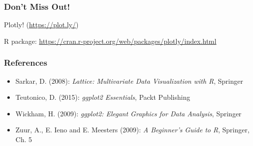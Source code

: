 \documentclass[10pt]{beamer}
\theoremstyle{definition}
\begin{document}
\begin{frame}[fragile]
\frametitle{Don't Miss Out!}
\begin{center}
\Huge{Plotly!}
(\url{https://plot.ly/})
\end{center}
R package: \url{https://cran.r-project.org/web/packages/plotly/index.html}
\end{frame}

\begin{frame}[fragile]
\frametitle{References}
\begin{itemize}
	\item Sarkar, D. (2008): \emph{Lattice: Multivariate Data Visualization with R}, Springer
	\item Teutonico, D. (2015): \emph{ggplot2 Essentials}, Packt Publishing
	\item Wickham, H. (2009): \emph{ggplot2: Elegant Graphics for Data Analysis}, Springer
	\item Zuur, A., E. Ieno and E. Meesters (2009): \emph{A Beginner’s Guide to R}, Springer, Ch. 5
\end{itemize}
\end{frame}
\end{document}
